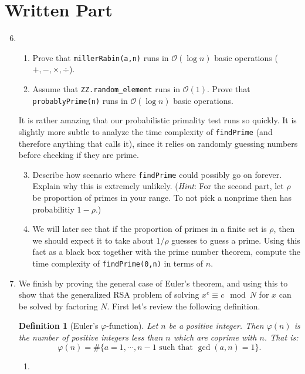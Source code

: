 \documentclass[11pt]{article}
\newtheorem{definition}{Definition}
\newcommand{\cO}{\mathcal{O}}
\begin{document}
\section*{Written Part}
\begin{enumerate}
  \setcounter{enumi}{5}
  \item{
  \begin{enumerate}
    \item{
    Prove that \verb|millerRabin(a,n)| runs in $\cO(\log n)$ basic operations ($+,-,\times,\div$).
    }
    \item{
    Assume that \verb|ZZ.random_element| runs in $\cO(1)$.  Prove that \verb|probablyPrime(n)| runs in $\cO(\log n)$ basic operations.
    }
  \end{enumerate}
  It is rather amazing that our probabilistic primality test runs so quickly.  It is slightly more subtle to analyze the time complexity of \verb|findPrime| (and therefore anything that calls it), since it relies on randomly guessing numbers before checking if they are prime.
  \begin{enumerate}
    \setcounter{enumii}{2}
    \item{
    Describe how scenario where \verb|findPrime| could possibly go on forever.  Explain why this is extremely unlikely.  (\textit{Hint}: For the second part, let $\rho$ be proportion of primes in your range.  To not pick a nonprime then has probabilitiy $1-\rho$.)
    }
    \item{
    We will later see that if the proportion of primes in a finite set is $\rho$, then we should expect it to take about $1/\rho$ guesses to guess a prime.  Using this fact as a black box together with the prime number theorem, compute the time complexity of \verb|findPrime(0,n)| in terms of $n$.
    }
  \end{enumerate}
  }
  \item{
  We finish by proving the general case of Euler's theorem, and using this to show that the generalized RSA problem of solving $x^e\equiv c\mod N$ for $x$ can be solved by factoring $N$.  First let's review the following definition.
  \begin{definition}[Euler's $\varphi$-function]
    Let $n$ be a positive integer.  Then $\varphi(n)$ is the number of positive integers less than $n$ which are coprime with $n$.  That is:
    \[\varphi(n) = \#\{a = 1,\cdots,n-1\text{ such that }\gcd(a,n) = 1\}.\]
  \end{definition}
  \begin{enumerate}
    \item{
}
\end{enumerate}}
\end{enumerate}
\end{document}
